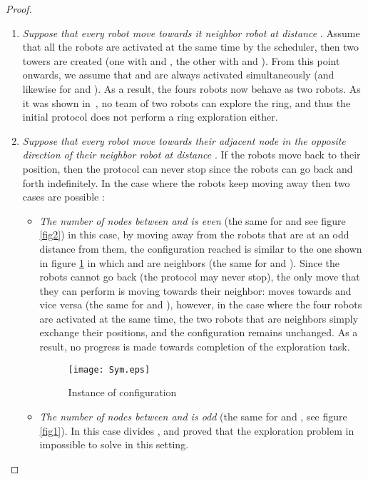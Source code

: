 \documentclass[12pt]{llncs}
\begin{document}
\begin{proof}
\begin{enumerate}
\item {\textit{Suppose that every robot move towards it neighbor robot at distance }}. Assume that all the robots are activated at the same time by the scheduler, then two towers are created (one with  and , the other with  and ). From this point onwards, we assume that  and  are always activated simultaneously (and likewise for  and ). As a result, the fours robots now behave as two robots. As it was shown in~\cite{stap09}, no team of two robots can explore the ring, and thus the initial protocol does not perform a ring exploration either.
\item {\textit{Suppose that every robot move towards their adjacent node in the opposite direction of their neighbor robot at distance }}. If the robots move back to their position, then the protocol can never stop since the robots can go back and forth indefinitely. In the case where the robots keep moving away then two cases are possible : 
\begin{itemize}
\item {\textit{The number of nodes between  and  is even} (the same for  and  see figure \ref{fig2})}  in this case, by moving away from the robots that are at an odd distance from them, the configuration reached is similar to the one shown in figure \ref{fig:figr3} in which  and  are neighbors (the same for  and ). Since the robots cannot go back (the protocol may never stop), the only move that they can perform is moving towards their neighbor:  moves towards  and vice versa (the same for  and ), however, in the case where the four robots are activated at the same time, the two robots that are neighbors simply exchange their positions, and the configuration remains unchanged. As a result, no progress is made towards completion of the exploration task. 
  
\begin{figure}[H]
  \centering
  \texttt{[image: Sym.eps]}
    \caption{Instance of configuration} 
    \label{fig:figr3}
\end{figure}


\item {\textit{The number of nodes between  and  is odd} (the same for  and , see figure \ref{fig1})}. In this case  divides , and \cite{davi07} proved that the exploration problem in impossible to solve in this setting.
\end{itemize}  
\end{enumerate}


\end{proof}
\end{document}
